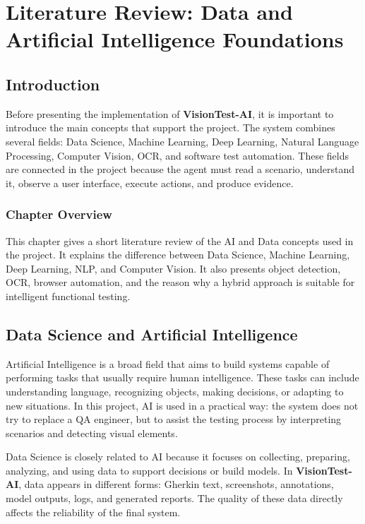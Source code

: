 \chapter{Literature Review: Data and Artificial Intelligence Foundations}
\label{chap:literature_review}
\minitoc
\newpage

\section{Introduction}
\label{sec:ch2_intro}

Before presenting the implementation of \textbf{VisionTest-AI}, it is important to introduce the main concepts that support the project. The system combines several fields: Data Science, Machine Learning, Deep Learning, Natural Language Processing, Computer Vision, OCR, and software test automation. These fields are connected in the project because the agent must read a scenario, understand it, observe a user interface, execute actions, and produce evidence.

\subsection*{Chapter Overview}
{}

This chapter gives a short literature review of the AI and Data concepts used in the project. It explains the difference between Data Science, Machine Learning, Deep Learning, NLP, and Computer Vision. It also presents object detection, OCR, browser automation, and the reason why a hybrid approach is suitable for intelligent functional testing.

\section{Data Science and Artificial Intelligence}
\label{sec:data_ai_foundations}

Artificial Intelligence is a broad field that aims to build systems capable of performing tasks that usually require human intelligence. These tasks can include understanding language, recognizing objects, making decisions, or adapting to new situations. In this project, AI is used in a practical way: the system does not try to replace a QA engineer, but to assist the testing process by interpreting scenarios and detecting visual elements.

Data Science is closely related to AI because it focuses on collecting, preparing, analyzing, and using data to support decisions or build models. In \textbf{VisionTest-AI}, data appears in different forms: Gherkin text, screenshots, annotations, model outputs, logs, and generated reports. The quality of these data directly affects the reliability of the final system.

